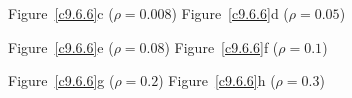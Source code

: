 \documentclass{ximera}
\begin{document}
\begin{exercise}
\begin{solution}
\begin{figure}[htb]
     \centerline{Figure~\ref{c9.6.6}c ($\rho = 0.008$)\hspace{1.3in} Figure~\ref{c9.6.6}d ($\rho = 0.05$)}
\end{figure}
\begin{figure}[htb]
     \centerline{%
     }
     \centerline{Figure~\ref{c9.6.6}e ($\rho = 0.08$)\hspace{1.3in} Figure~\ref{c9.6.6}f ($\rho = 0.1$)}
\end{figure}
\begin{figure}[htb]
     \centerline{%
     }
     \centerline{Figure~\ref{c9.6.6}g ($\rho = 0.2$)\hspace{1.3in} Figure~\ref{c9.6.6}h ($\rho = 0.3$)}
\end{figure}

\clearpage

\end{solution}
\end{exercise}
\end{document}
